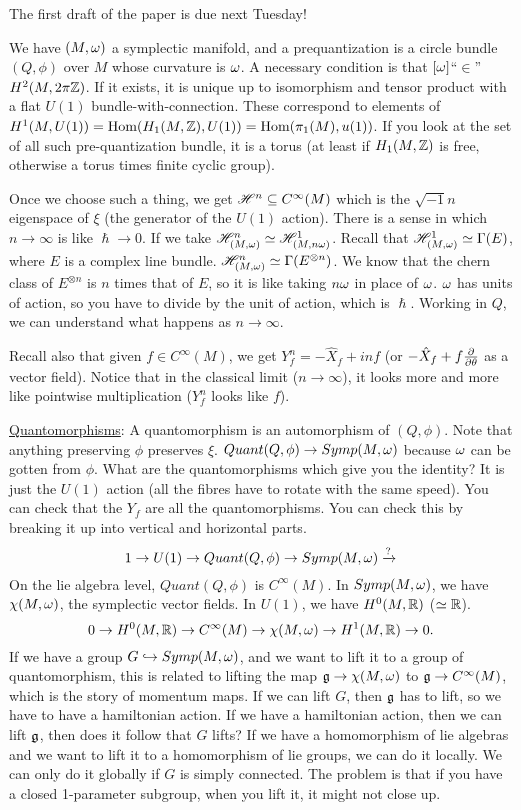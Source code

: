  \setcounter{lecture}{22}

 The first draft of the paper is due next Tuesday!

 We have $(M,\omega)$ a symplectic manifold, and a prequantization is a circle bundle
 $(Q,\phi)$ over $M$ whose curvature is $\omega$.  A necessary condition is that
 $[\omega]$``$\in$''$H^2(M,2\pi\mathbb{Z})$.  If it exists, it is unique up to isomorphism and
 tensor product with a flat $U(1)$ bundle-with-connection.  These correspond to
 elements of$H^1(M,U(1)) = \text{\rm Hom}(H_1(M,\mathbb{Z}),U(1)) = \text{\rm Hom}(\pi_1(M),u(1))$.  If you look
 at the set of all such pre-quantization bundle, it is a torus (at least if
 $H_1(M,\mathbb{Z})$ is free, otherwise a torus times finite cyclic group).

 Once we choose such a thing, we get $\mathscr{H}^n\subseteq C^\infty(M)$ which is the
 $\sqrt{-1} n$ eigenspace of $\xi$ (the generator of the $U(1)$ action).  There is a
 sense in which $n\to \infty$ is like $\hslash\to 0$.  If we take $\mathscr{H}^n_{(M,\omega)}\simeq
 \mathscr{H}^1_{(M,n\omega)}$.  Recall that $\mathscr{H}^1_{(M,\omega)}\simeq \Gamma(E)$, where $E$ is a complex
 line bundle.  $\mathscr{H}^n_{(M,\omega)}\simeq \Gamma(E^{\otimes n})$.  We know that the chern
 class of $E^{\otimes n}$ is $n$ times that of $E$, so it is like taking $n\omega$ in
 place of $\omega$.  $\omega$ has units of action, so you have to divide by the unit of
 action, which is $\hslash$. Working in $Q$, we can understand what happens as $n\to
 \infty$.

 Recall also that given $f\in C^\infty(M)$, we get $Y_f^n = -\hat X_f + inf$ (or
 $-\hat X_f +f\frac{\partial }{\partial \theta}$ as a vector field).  Notice that in the classical limit
 ($n\to \infty$), it looks more and more like pointwise multiplication ($Y_f^n$ looks
 like $f$).

 \underline{Quantomorphisms}: A quantomorphism is an automorphism of $(Q,\phi)$.  Note
 that anything preserving $\phi$ preserves $\xi$.  $Quant(Q,\phi)\to Symp(M,\omega)$
 because $\omega$ can be gotten from $\phi$.  What are the quantomorphisms which give you
 the identity?  It is just the $U(1)$ action (all the fibres have to rotate with the
 same speed).  You can check that the $Y_f$ are all the quantomorphisms.  You can
 check this by breaking it up into vertical and horizontal parts.
 \[
    1\to U(1)\to Quant(Q,\phi) \to Symp(M,\omega) \xrightarrow{?}
 \]
 On the lie algebra level, $Quant(Q,\phi)$ is $C^\infty(M)$.  In $Symp(M,\omega)$, we have
 $\chi(M,\omega)$, the symplectic vector fields.  In $U(1)$, we have $H^0(M,\mathbb{R})$ ($\simeq
 \mathbb{R}$).
 \[
    0\to H^0(M,\mathbb{R}) \to C^\infty(M) \to \chi(M,\omega) \to H^1(M,\mathbb{R}) \to 0.
 \]
 If we have a group $G\hookrightarrow Symp(M,\omega)$, and we want to lift it to a group
 of quantomorphism,  this is related to lifting the map $\mathfrak{g}\to \chi(M,\omega)$ to $\mathfrak{g}\to
 C^\infty(M)$, which is the story of momentum maps.  If we can lift $G$, then $\mathfrak{g}$ has
 to lift, so we have to have a hamiltonian action.  If we have a hamiltonian action,
 then we can lift $\mathfrak{g}$, then does it follow that $G$ lifts?  If we have a homomorphism
 of lie algebras and we want to lift it to a homomorphism of lie groups, we can do it
 locally.  We can only do it globally if $G$ is simply connected.  The problem is that
 if you have a closed 1-parameter subgroup, when you lift it, it might not close up.

